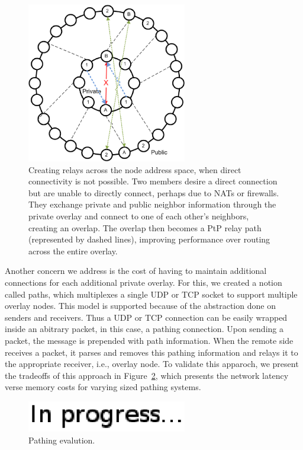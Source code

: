 \documentclass[conference]{IEEEtran}
\begin{document}
\begin{figure}[h]
\centering
\includegraphics[width=2.75in]{subring_tunnel.eps}
\caption{Creating relays across the node address space, when direct
connectivity is not possible.  Two members desire a direct connection but are
unable to directly connect, perhaps due to NATs or firewalls.  They exchange
private and public neighbor information through the private overlay and connect
to one of each other's neighbors, creating an overlap.  The overlap then
becomes a PtP relay path (represented by dashed lines), improving performance
over routing across the entire overlay.}
\label{fig:overlay_relay}
\end{figure}

Another concern we address is the cost of having to maintain additional
connections for each additional private overlay.  For this, we created a notion
called paths, which multiplexes a single UDP or TCP socket to support multiple
overlay nodes.  This model is supported because of the abstraction done on
senders and receivers.  Thus a UDP or TCP connection can be easily wrapped 
inside an abitrary packet, in this case, a pathing connection.  Upon sending
a packet, the message is prepended with path information.  When the remote side
receives a packet, it parses and removes this pathing information and relays it
to the appropriate receiver, i.e., overlay node.  To validate this apparoch, we
present the tradeoffs of this approach in Figure~\ref{fig:pathing_eval}, which
presents the network latency verse memory costs for varying sized pathing systems.

\begin{figure}[h]
\centering
\includegraphics[width=2.75in]{in_progress.eps}
\caption{Pathing evalution.}
\label{fig:pathing_eval}
\end{figure}
\end{document}
